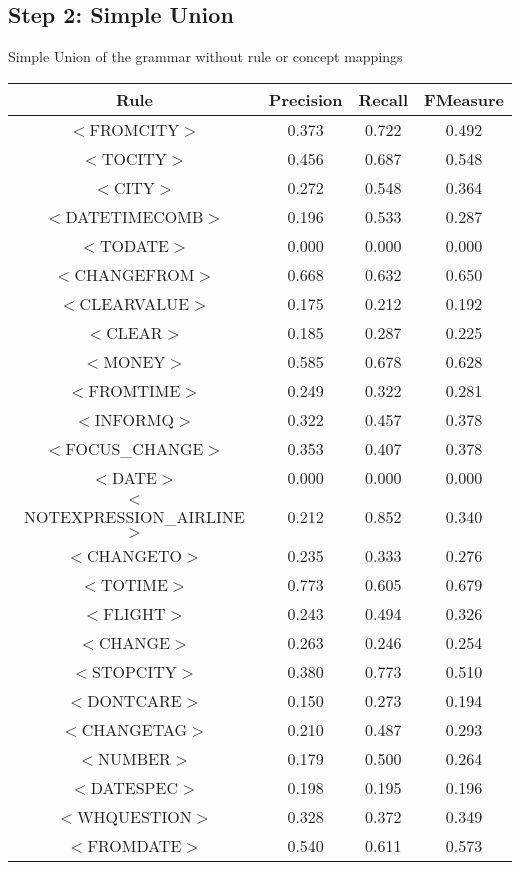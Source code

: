 \documentclass[a4paper,10pt]{article}
\begin{document}
\subsection{Step 2: Simple Union}
Simple Union of the grammar without rule or concept mappings

 \label{tab:title} 
\begin{center}
\begin{tabular}{|c||c|c|c|}
\hline
Rule&Precision&Recall&FMeasure\\
\hline
\hline
$<$FROMCITY$>$&0.373&0.722&0.492 \\
\hline$<$TOCITY$>$&0.456&0.687&0.548 \\
\hline$<$CITY$>$&0.272&0.548&0.364 \\
\hline$<$DATETIMECOMB$>$&0.196&0.533&0.287 \\
\hline$<$TODATE$>$&0.000&0.000&0.000 \\
\hline$<$CHANGEFROM$>$&0.668&0.632&0.650 \\
\hline$<$CLEARVALUE$>$&0.175&0.212&0.192 \\
\hline$<$CLEAR$>$&0.185&0.287&0.225 \\
\hline$<$MONEY$>$&0.585&0.678&0.628 \\
\hline$<$FROMTIME$>$&0.249&0.322&0.281 \\
\hline$<$INFORMQ$>$&0.322&0.457&0.378 \\
\hline$<$FOCUS\_CHANGE$>$&0.353&0.407&0.378 \\
\hline$<$DATE$>$&0.000&0.000&0.000 \\
\hline$<$NOTEXPRESSION\_AIRLINE$>$&0.212&0.852&0.340 \\
\hline$<$CHANGETO$>$&0.235&0.333&0.276 \\
\hline$<$TOTIME$>$&0.773&0.605&0.679 \\
\hline$<$FLIGHT$>$&0.243&0.494&0.326 \\
\hline$<$CHANGE$>$&0.263&0.246&0.254 \\
\hline$<$STOPCITY$>$&0.380&0.773&0.510 \\
\hline$<$DONTCARE$>$&0.150&0.273&0.194 \\
\hline$<$CHANGETAG$>$&0.210&0.487&0.293 \\
\hline$<$NUMBER$>$&0.179&0.500&0.264 \\
\hline$<$DATESPEC$>$&0.198&0.195&0.196 \\
\hline$<$WHQUESTION$>$&0.328&0.372&0.349 \\
\hline$<$FROMDATE$>$&0.540&0.611&0.573 \\

\end{tabular}
\end{center}
\end{document}
